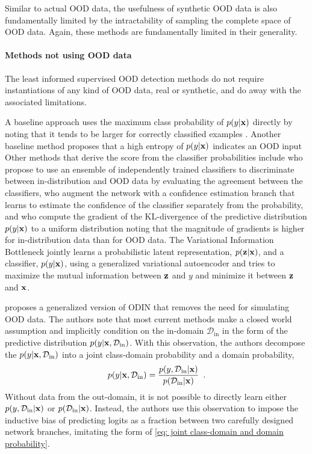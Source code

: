 Similar to actual OOD data, the usefulness of synthetic OOD data is also fundamentally limited by the intractability of sampling the complete space of OOD data. Again, these methods are fundamentally limited in their generality.

\paragraph{Methods not using OOD data}
The least informed supervised OOD detection methods do not require instantiations of any kind of OOD data, real or synthetic, and do away with the associated limitations.

A baseline approach uses the maximum class probability of $p(y|{\mathbf{x}})$ directly by noting that it tends to be larger for correctly classified examples \parencite{hendrycks_baseline_2017}. Another baseline method proposes that a high entropy of $p(y|{\mathbf{x}})$ indicates an OOD input \parencite{ren_likelihood_2019} 
Other methods that derive the score from the classifier probabilities include \textcite{lakshminarayanan_simple_2017} who propose to use an ensemble of independently trained classifiers to discriminate between in-distribution and OOD data by evaluating the agreement between the classifiers, \textcite{devries_learning_2018} who augment the network with a confidence estimation branch that learns to estimate the confidence of the classifier separately from the probability, and \textcite{huang_importance_2021} who compute the gradient of the KL-divergence of the predictive distribution $p(y|{\mathbf{x}})$ to a uniform distribution noting that the magnitude of gradients is higher for in-distribution data than for OOD data. 
The Variational Information Bottleneck \parencite{alemi_deep_2017} jointly learns a probabilistic latent representation, $p({\mathbf{z}}|{\mathbf{x}})$, and a classifier, $p(y|{\mathbf{x}})$, using a generalized variational autoencoder \parencite{kingma_autoencoding_2014} and tries to maximize the mutual information between ${\mathbf{z}}$ and $y$ and minimize it between ${\mathbf{z}}$ and ${\mathbf{x}}$.

\textcite{hsu_generalized_2020} proposes a generalized version of ODIN that removes the need for simulating OOD data.
The authors note that most current methods make a closed world assumption and implicitly condition on the in-domain $\mathcal{D}_{\text{in}}$ in the form of the predictive distribution $p(y|{\mathbf{x}}, \mathcal{D}_{\text{in}})$. With this observation, the authors decompose the $p(y|{\mathbf{x}}, \mathcal{D}_{\text{in}})$ into a joint class-domain probability and a domain probability,
%
\begin{equation} \label{eq: joint class-domain and domain probability}
    p(y|\xb,\mathcal{D}_{\text{in}}) = \frac{p(y, \mathcal{D}_{\text{in}}|\xb)}{p(\mathcal{D}_{\text{in}}|\xb)} \enspace .
\end{equation}
%
Without data from the out-domain, it is not possible to directly learn either $p(y, \mathcal{D}_{\text{in}}|{\mathbf{x}})$ or $p(\mathcal{D}_{\text{in}}|{\mathbf{x}})$. Instead, the authors use this observation to impose the inductive bias of predicting logits as a fraction between two carefully designed network branches, imitating the form of \cref{eq: joint class-domain and domain probability}. 

